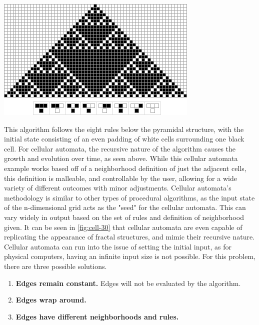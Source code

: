 \documentclass[10pt]{report}
\begin{document}
		\begin{minipage}{\textwidth}
			\centering
			\includegraphics[scale=0.8]{rule-30}
			\label{fig:cell-30}
		\end{minipage}
	
		This algorithm follows the eight rules below the pyramidal structure, with the initial state consisting of an even padding of white cells surrounding one black cell. For cellular automata, the recursive nature of the algorithm causes the growth and evolution over time, as seen above. While this cellular automata example works based off of a neighborhood definition of just the adjacent cells, this definition is malleable, and controllable by the user, allowing for a wide variety of different outcomes with minor adjustments. Cellular automata's methodology is similar to other types of procedural algorithms, as the input state of the n-dimensional grid acts as the "seed" for the cellular automata. This can vary widely in output based on the set of rules and definition of neighborhood given. It can be seen in \autoref{fig:cell-30} that cellular automata are even capable of replicating the appearance of fractal structures, and mimic their recursive nature. Cellular automata can run into the issue of setting the initial input, as for physical computers, having an infinite input size is not possible. For this problem, there are three possible solutions. 
		
		\begin{enumerate}
			\item \textbf{Edges remain constant.} Edges will not be evaluated by the algorithm.
			\item \textbf{Edges wrap around.}
			\item \textbf{Edges have different neighborhoods and rules.} \cite{nature-of-code}
		\end{enumerate}
		
\end{document}
